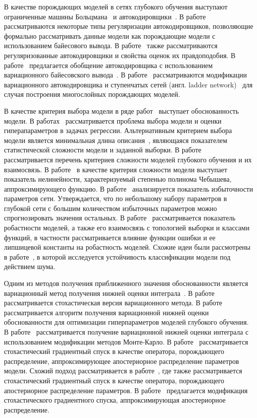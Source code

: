В качестве порождающих моделей в сетях глубокого обучения выступают ограниченные машины Больцмана~\cite{hinton_rbm} и автокодировщики~\cite{founds}. В работе~\cite{contractive} рассматриваются некоторые типы регуляризации автокодировщиков, позволяющие формально рассматривать данные модели как порождающие модели с использованием байесового вывода. В работе~\cite{score} также рассматриваются регуляризованные автокодировщики и свойства оценок их правдоподобия. В работе~\cite{vae} предлагается обобщение автокодировщика с использованием вариационного байесовского вывода~\cite{bishop}. В работе~\cite{train_generative} рассматриваются модификации вариационного автокодировщика и ступенчатых сетей (англ. ladder network)~\cite{ladder} для случая построения многослойных порождающих моделей. 

В качестве критерия выбора модели в ряде работ~\cite{mackay,bishop,tokmakova,zaitsev,strijov_webber, strijov_dsc} выступает обоснованность модели. В работах~\cite{tokmakova,zaitsev,strijov_webber, strijov_dsc} рассматривается проблема выбора модели и оценки гиперапараметров в задачах регрессии. Альтернативным критерием выбора модели является минимальная длина описания~\cite{mdl}, являющаяся показателем статистической сложности модели и заданной выборки. 
В работе~\cite{perekrestenko} рассматривается перечень критериев сложности моделей глубокого обучения и их взаимосвязь. В работе~\cite{vladis} в качестве критерия сложности модели выступает показатель нелинейности, характеризуемый степенью полинома Чебышева, аппроксимирующего функцию. В работе~\cite{need_prune} анализируется показатель избыточности параметров сети. Утверждается, что по небольшому набору параметров в глубокой сети с большим количеством избыточных параметров можно спрогнозировать значения остальных. В работе~\cite{rob} рассматривается показатель робастности моделей, а также его взаимосвязь с топологией выборки и классами функций, в частности рассматривается влияние функции ошибки и ее липшицевой константы на робастность моделей. Схожие идеи были рассмотрены в работе~\cite{intrig}, в которой исследуется устойчивость классификации модели под действием шума. 

Одним из методов получения приближенного значения обоснованности является вариационный метод получения нижней оценки интеграла~\cite{bishop}. В работе~\cite{hoffman} рассматривается стохастическая версия вариационного метода. В работе~\cite{nips} рассматривается алгоритм получения вариационной нижней оценки обоснованности  для оптимизации гиперпараметров моделей глубокого обучения. В работе~\cite{varmc} рассматривается получение вариационной нижней оценки интеграла с использованием модификации методов Монте-Карло. В работе~\cite{early} рассматривается стохастический градиентный спуск в качестве оператора, порождающего распределение, аппроксимирующее апостериорное распределение параметров модели. Схожий подход рассматривается в работе~\cite{sgd_cont}, где также рассматривается стохастический градиентный спуск в качестве оператора, порождающего апостериорное распределение параметров. В работе~\cite{langevin} предлагается модификация стохастического градиентного спуска, аппроксимирующая апостериорное распределение. 

